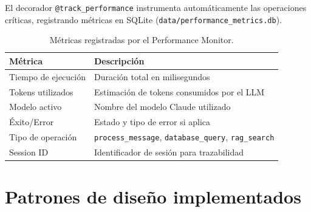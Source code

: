 El decorador \texttt{@track\_performance} instrumenta automáticamente las operaciones críticas, registrando métricas en SQLite (\texttt{data/performance\_metrics.db}).

\begin{table}[H]
\centering
\caption{Métricas registradas por el Performance Monitor.}
\label{tab:appendix_perfmetrics}
\footnotesize
\begin{tabularx}{\columnwidth}{lX}
\toprule
\textbf{Métrica} & \textbf{Descripción} \\
\midrule
Tiempo de ejecución & Duración total en milisegundos \\
Tokens utilizados & Estimación de tokens consumidos por el \ac{LLM} \\
Modelo activo & Nombre del modelo Claude utilizado \\
Éxito/Error & Estado y tipo de error si aplica \\
Tipo de operación & \texttt{process\_message}, \texttt{database\_query}, \texttt{rag\_search} \\
Session ID & Identificador de sesión para trazabilidad \\
\bottomrule
\end{tabularx}
\end{table}

\section{Patrones de diseño implementados}
\label{sec:appendix_patrones}

